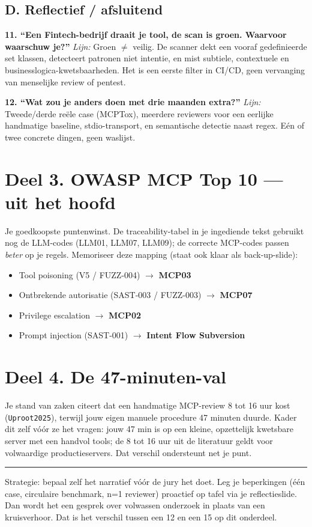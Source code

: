 \documentclass[11pt,a4paper]{article}
\newcommand{\code}[1]{\texttt{\small #1}}
\newcommand{\lijn}[1]{\textit{Lijn:} #1\par}
\begin{document}
\subsection{D. Reflectief / afsluitend}

\textbf{11. ``Een Fintech-bedrijf draait je tool, de scan is groen. Waarvoor waarschuw je?''}
\lijn{Groen $\neq$ veilig. De scanner dekt een vooraf gedefinieerde set klassen, detecteert patronen niet intentie, en mist subtiele, contextuele en businesslogica-kwetsbaarheden. Het is een eerste filter in CI/CD, geen vervanging van menselijke review of pentest.}

\textbf{12. ``Wat zou je anders doen met drie maanden extra?''}
\lijn{Tweede/derde re\"ele case (MCPTox), meerdere reviewers voor een eerlijke handmatige baseline, stdio-transport, en semantische detectie naast regex. E\'en of twee concrete dingen, geen waslijst.}

\section{Deel 3. OWASP MCP Top 10 --- uit het hoofd}

Je goedkoopste puntenwinst. De traceability-tabel in je ingediende tekst gebruikt
nog de LLM-codes (LLM01, LLM07, LLM09); de correcte MCP-codes passen \emph{beter}
op je regels. Memoriseer deze mapping (staat ook klaar als back-up-slide):

\begin{itemize}
  \item Tool poisoning (V5 / FUZZ-004) $\rightarrow$ \textbf{MCP03}
  \item Ontbrekende autorisatie (SAST-003 / FUZZ-003) $\rightarrow$ \textbf{MCP07}
  \item Privilege escalation $\rightarrow$ \textbf{MCP02}
  \item Prompt injection (SAST-001) $\rightarrow$ \textbf{Intent Flow Subversion}
\end{itemize}

\section{Deel 4. De 47-minuten-val}

Je stand van zaken citeert dat een handmatige MCP-review 8 tot 16 uur kost
(\code{Uproot2025}), terwijl jouw eigen manuele procedure 47 minuten duurde. Kader
dit zelf v\'o\'or ze het vragen: jouw 47 min is op een kleine, opzettelijk
kwetsbare server met een handvol tools; de 8 tot 16 uur uit de literatuur geldt
voor volwaardige productieservers. Dat verschil ondersteunt net je punt.

\vspace{1em}
\hrule
\vspace{0.5em}
{\color{hggrey}\small Strategie: bepaal zelf het narratief v\'o\'or de jury het doet.
Leg je beperkingen (\'e\'en case, circulaire benchmark, n=1 reviewer) proactief op
tafel via je reflectieslide. Dan wordt het een gesprek over volwassen onderzoek in
plaats van een kruisverhoor. Dat is het verschil tussen een 12 en een 15 op dit
onderdeel.}
\end{document}
